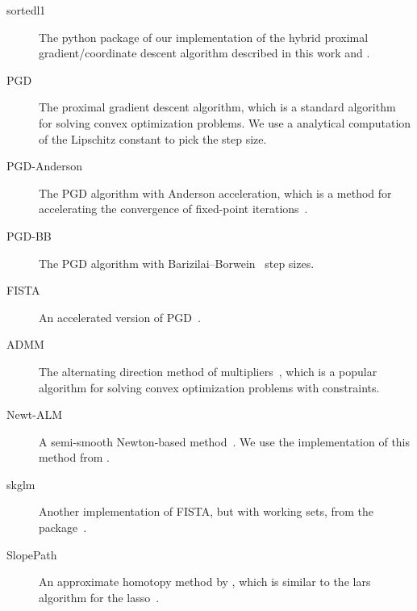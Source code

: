 \documentclass[article]{jss}
\begin{document}
\begin{description}
  \item[sortedl1] The python package of our implementation of the hybrid
        proximal gradient/coordinate descent algorithm described in this work and
        \citet{larsson2023}.
  \item[PGD] The proximal gradient descent algorithm, which is a standard
        algorithm for solving convex optimization problems. We use a
        analytical computation of the Lipschitz constant to pick the step size.
  \item[PGD-Anderson] The PGD algorithm with Anderson acceleration, which is a
        method for accelerating the convergence of fixed-point
        iterations~\citep{anderson1965,zhang2020}.
  \item[PGD-BB] The PGD algorithm with Barizilai--Borwein~\citep{barzilai1988} step sizes.
  \item[FISTA] An accelerated version of PGD~\citep{beck2009}.
  \item[ADMM] The alternating direction method of
        multipliers~\citep{glowinski1975,boyd2010}, which is a popular algorithm
        for solving convex optimization problems with constraints.
  \item[Newt-ALM] A semi-smooth Newton-based method~\citep{luo2019}. We use the
        implementation of this method from \citet{larsson2023}.
  \item[skglm] Another implementation of FISTA, but with working sets, from the
         package~\citep{bertrand2022}.
  \item[SlopePath] An approximate homotopy method by \citet{dupuis2024},
        which is similar to the lars algorithm for the lasso~\citep{efron2004}.
\end{description}



\newpage

\begin{appendix}

\end{appendix}
\end{document}
